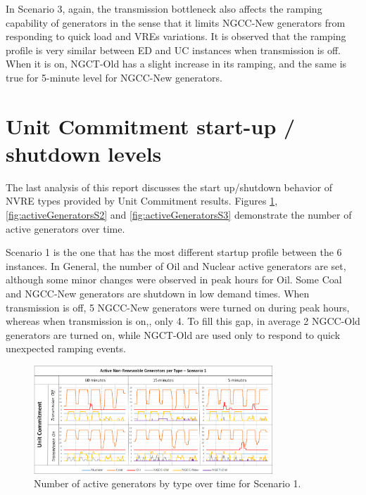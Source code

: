 \documentclass[12pt,LUDisStyle,twosided]{book}
\begin{document}
In Scenario 3, again, the transmission bottleneck also affects the ramping capability of generators in the sense that it limits NGCC-New generators from responding to quick load and VREs variations. It is observed that the ramping profile is very similar between ED and UC instances when transmission is off. When it is on, NGCT-Old has a slight increase in its ramping, and the same is true for 5-minute level for NGCC-New generators. 

\section{Unit Commitment start-up / shutdown levels} \label{section:uconoffstatus}

The last analysis of this report discusses the start up/shutdown behavior of NVRE types provided by Unit Commitment results. Figures \ref{fig:activeGeneratorsS1}, \ref{fig:activeGeneratorsS2} and \ref{fig:activeGeneratorsS3} demonstrate the number of active generators over time.

Scenario 1 is the one that has the most different startup profile between the 6 instances. In General, the number of Oil and Nuclear active generators are set, although some minor changes were observed in peak hours for Oil. Some Coal and NGCC-New generators are shutdown in low demand times. When transmission is off, 5 NGCC-New generators were turned on during peak hours, whereas when transmission is on,, only 4. To fill this gap, in average 2 NGCC-Old generators are turned on, while NGCT-Old are used only to respond to quick unexpected ramping events.

\begin{figure}[H] 
  \centering
  
	  \includegraphics[width=0.8\textwidth,keepaspectratio]{activeGeneratorsS1.png}
  
  \caption{Number of active generators by type over time for Scenario 1.}
  \label{fig:activeGeneratorsS1}
  \end{figure}
  
\end{document}
